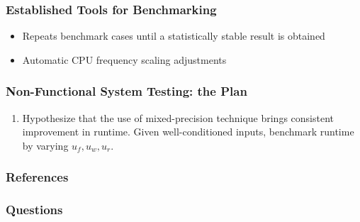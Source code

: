 \documentclass[t,12pt,numbers,fleqn]{beamer}
\begin{document}

\begin{frame}
\frametitle{Established Tools for Benchmarking}

\cite{noauthor_googlebenchmark_2025}
\begin{itemize}
\item Repeats benchmark cases until a statistically stable result is obtained
\item Automatic CPU frequency scaling adjustments
\end{itemize}

\end{frame}


\begin{frame}
\frametitle{Non-Functional System Testing: the Plan}

\begin{enumerate}
\item Hypothesize that the use of mixed-precision technique brings consistent
  improvement in runtime. Given well-conditioned inputs, benchmark runtime by
  varying \(u_f, u_w, u_r\).
\end{enumerate}

\end{frame}


\begin{frame}
\frametitle{References}

\printbibliography[heading=none]{}

\end{frame}


\begin{frame}
\frametitle{Questions}

\end{frame}

\end{document}
